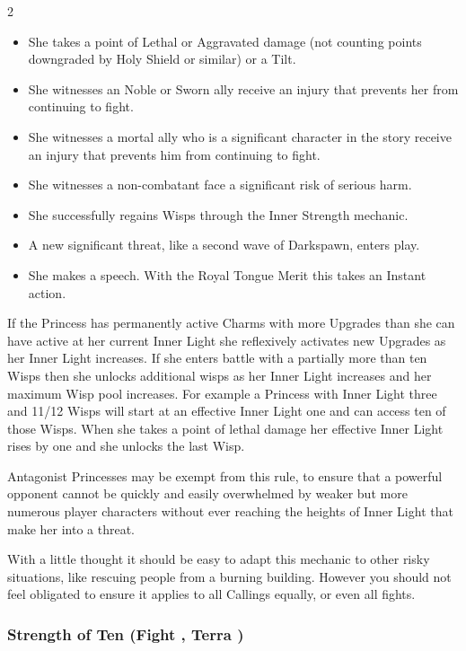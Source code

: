 \begin{multicols}{2}
 \begin{itemize}
 \item She takes a point of Lethal or Aggravated damage (not counting points downgraded by Holy Shield or similar) or a Tilt.
 \item She witnesses an Noble or Sworn ally receive an injury that prevents her from continuing to fight.
 \item She witnesses a mortal ally who is a significant character in the story receive an injury that prevents him from continuing to fight.
 \item She witnesses a non-combatant face a significant risk of serious harm.
 \item She successfully regains Wisps through the Inner Strength mechanic. 
 \item A new significant threat, like a second wave of Darkspawn, enters play. 
 \item She makes a speech. With the Royal Tongue Merit this takes an Instant action. 
 \end{itemize}
 
 If the Princess has permanently active Charms with more Upgrades than she can have active at her current Inner Light she reflexively activates new Upgrades as her Inner Light increases. If she enters battle with a partially more than ten Wisps then she unlocks additional wisps as her Inner Light increases and her maximum Wisp pool increases. For example a Princess with Inner Light three and 11/12 Wisps will start at an effective Inner Light one and can access ten of those Wisps. When she takes a point of lethal damage her effective Inner Light rises by one and she unlocks the last Wisp. 
 
 Antagonist Princesses may be exempt from this rule, to ensure that a powerful opponent cannot be quickly and easily overwhelmed by weaker but more numerous player characters without ever reaching the heights of Inner Light that make her into a threat.  
 
 With a little thought it should be easy to adapt this mechanic to other risky situations, like rescuing people from a burning building. However you should not feel obligated to ensure it applies to all Callings equally, or even all fights. 
 
\bigsidebarend

\subsubsection*{Strength of Ten (Fight \textbullet\textbullet\textbullet\textbullet\textbullet, Terra \textbullet\textbullet\textbullet)}


\end{multicols}
